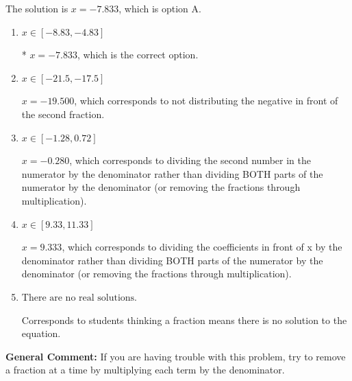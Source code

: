 \documentclass{extbook}[14pt]
\begin{document}
\begin{enumerate}
{The solution is \( x = -7.833 \), which is option A.\begin{enumerate}[label=\Alph*.]
\item \( x \in [-8.83, -4.83] \)

* $x = -7.833$, which is the correct option.
\item \( x \in [-21.5, -17.5] \)

 $x = -19.500$, which corresponds to not distributing the negative in front of the second fraction.
\item \( x \in [-1.28, 0.72] \)

 $x = -0.280$, which corresponds to dividing the second number in the numerator by the denominator rather than dividing BOTH parts of the numerator by the denominator (or removing the fractions through multiplication).
\item \( x \in [9.33, 11.33] \)

 $x = 9.333$, which corresponds to dividing the coefficients in front of x by the denominator rather than dividing BOTH parts of the numerator by the denominator (or removing the fractions through multiplication).
\item \( \text{There are no real solutions.} \)

Corresponds to students thinking a fraction means there is no solution to the equation.
\end{enumerate}

\textbf{General Comment:} If you are having trouble with this problem, try to remove a fraction at a time by multiplying each term by the denominator.
}
\end{enumerate}
\end{document}
